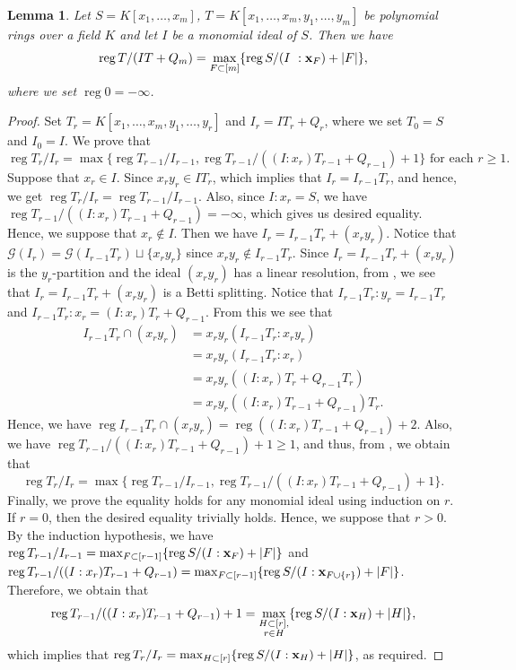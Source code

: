 \documentclass[12pt]{amsart}
\newtheorem{lemma}[thm]{Lemma}
\theoremstyle{definition}
\theoremstyle{remark}
\DeclareMathOperator{\reg}{reg}
\begin{document}
\begin{lemma}\label{lemma2}
Let $S=K[x_{1},\ldots, x_{m}]$, $T=K[x_{1},\ldots, x_{m}, y_{1},\ldots, y_{m}]$ be polynomial rings over a field $K$ and let $I$ be a monomial ideal of $S$. Then we have  
$$\reg T/(IT+Q_{m})=\max_{F\subset[m]}\{\reg S/(I\,\,: {\bf x}_{F})+|F|\},$$
where we set $\reg 0=-\infty$.  
\end{lemma}
\begin{proof}
Set $T_{r}=K[x_{1},\ldots, x_{m},y_{1},\ldots, y_{r}]$ and $I_{r}=IT_{r}+Q_{r}$, where we set $T_{0}=S$ and $I_{0}=I$. We prove that 
$$\reg T_{r}/I_{r}=\max\{\reg T_{r-1}/I_{r-1}, \reg T_{r-1}/((I:x_{r})T_{r-1}+Q_{r-1})+1\}\mbox{ for each }r\geq1.$$
Suppose that $x_{r}\in I$. Since $x_{r}y_{r}\in IT_{r}$, which implies that $I_{r}=I_{r-1}T_{r}$, and hence, we get $\reg T_{r}/I_{r}=\reg T_{r-1}/I_{r-1}$. Also, since $I:x_{r}=S$, we have $\reg T_{r-1}/((I:x_{r})T_{r-1}+Q_{r-1})=-\infty$, which gives us desired equality. Hence, we suppose that $x_{r}\notin I$. Then we have $I_{r}=I_{r-1}T_{r}+(x_{r}y_{r})$. Notice that $\mathcal{G}(I_{r})=\mathcal{G}(I_{r-1}T_{r})\sqcup\{x_{r}y_{r}\}$ since $x_{r}y_{r}\notin I_{r-1}T_{r}$. Since $I_{r}=I_{r-1}T_{r}+(x_{r}y_{r})$ is the $y_{r}$-partition and the ideal $(x_{r}y_{r})$ has a linear resolution, from \cite[Corollary 2.7]{fhv2009}, we see that $I_{r}=I_{r-1}T_{r}+(x_{r}y_{r})$ is a Betti splitting. Notice that $I_{r-1}T_{r}:y_{r}=I_{r-1}T_{r}$ and $I_{r-1}T_{r}:x_{r}=(I:x_{r})T_{r}+Q_{r-1}$. From this we see that 
\begin{align*}
I_{r-1}T_{r}\cap(x_{r}y_{r})&=x_{r}y_{r}(I_{r-1}T_{r}:x_{r}y_{r})\\
&=x_{r}y_{r}(I_{r-1}T_{r}:x_{r})\\
&=x_{r}y_{r}((I:x_{r})T_{r}+Q_{r-1}T_{r})\\
&=x_{r}y_{r}((I:x_{r})T_{r-1}+Q_{r-1})T_{r}.
\end{align*}
Hence, we have $\reg I_{r-1}T_{r}\cap(x_{r}y_{r})=\reg((I:x_{r})T_{r-1}+Q_{r-1})+2$. Also, we have $\reg T_{r-1}/((I:x_{r})T_{r-1}+Q_{r-1})+1\geq1$, and thus, from  \cite[Corollary 2.2]{fhv2009}, we obtain that 
$$\reg T_{r}/I_{r}=\max\{\reg T_{r-1}/I_{r-1}, \reg T_{r-1}/((I:x_{r})T_{r-1}+Q_{r-1})+1\}.$$
Finally, we prove the equality holds for any monomial ideal using induction on $r$. 
If $r=0$, then the desired equality trivially holds. Hence, we suppose that $r>0$. By the induction hypothesis, we have $\reg T_{r-1}/I_{r-1}=\max_{F\subset[r-1]}\{\reg S/(I:{\bf x}_{F})+|F|\}$ and $\reg T_{r-1}/((I:x_{r})T_{r-1}+Q_{r-1})=\max_{F\subset[r-1]}\{\reg S/(I:{\bf x}_{F\cup\{r\}})+|F|\}$. Therefore, we obtain that 
$$\reg T_{r-1}/((I:x_{r})T_{r-1}+Q_{r-1})+1=\max_{\substack{H\subset[r],\\r\in H}}\{\reg S/(I:{\bf x}_{H})+|H|\},$$ which implies that $\reg T_{r}/I_{r}=\max_{H\subset[r]}\{\reg S/(I:{\bf x}_{H})+|H|\}$, 
as required. 
\end{proof}
\end{document}
